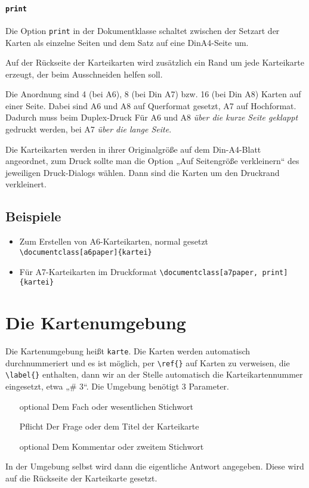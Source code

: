 \documentclass[a4paper]{article}
\begin{document}
\paragraph{\lstinline!print!} Die Option \lstinline!print! in der Dokumentklasse schaltet zwischen der Setzart der Karten als einzelne Seiten und dem Satz auf eine DinA4-Seite um.

Auf der Rückseite der Karteikarten wird zusätzlich ein Rand um jede Karteikarte erzeugt, der beim Ausschneiden helfen soll.

Die Anordnung sind 4 (bei A6), 8 (bei Din A7) bzw. 16 (bei Din A8) Karten auf einer Seite. Dabei sind A6 und A8 auf Querformat gesetzt, A7 auf Hochformat. Dadurch muss beim Duplex-Druck Für A6 und A8 \emph{über die kurze Seite geklappt} gedruckt werden, bei A7 \emph{über die lange Seite}.

Die Karteikarten werden in ihrer Originalgröße auf dem Din-A4-Blatt angeordnet, zum Druck sollte man die Option „Auf Seitengröße verkleinern“ des jeweiligen Druck-Dialogs wählen. Dann sind die Karten um den Druckrand verkleinert.
\subsection{Beispiele}
\begin{itemize}
	\item Zum Erstellen von A6-Karteikarten, normal gesetzt \lstinline!\documentclass[a6paper]{kartei}!
	\item Für A7-Karteikarten im Druckformat \lstinline!\documentclass[a7paper, print]{kartei}!
\end{itemize}
%
%
%
\section{Die Kartenumgebung}
Die Kartenumgebung heißt \lstinline!karte!. Die Karten werden automatisch durchnummeriert und es ist möglich, per \lstinline!\ref{}! auf Karten zu verweisen, die \lstinline!\label{}! enthalten, dann wir an der Stelle automatisch die Karteikartennummer eingesetzt, etwa „\# 3“. Die Umgebung benötigt 3 Parameter.
\begin{enumerate}
	\item[optional] Dem Fach oder wesentlichen Stichwort
	\item[Pflicht] Der Frage oder dem Titel der Karteikarte
	\item[optional] Dem Kommentar oder zweitem Stichwort
\end{enumerate}
In der Umgebung selbst wird dann die eigentliche Antwort angegeben. Diese wird auf die Rückseite der Karteikarte gesetzt.
\end{document}
